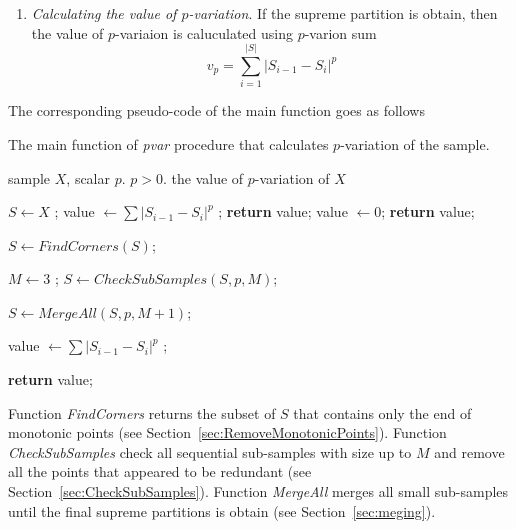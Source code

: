 \documentclass[12pt, a4paper]{article}
\numberwithin{equation}{section}
\begin{document}
\begin{enumerate}
  \item \emph{Calculating the value of $p$-variation}.  
  If the supreme partition is obtain, then
  the value of $p$-variaion is caluculated using 
  $p$-varion sum
  $$
  v_p = \sum_{i=1}^{|S|} |S_{i-1}-S_i |^p
  $$
  
  
\end{enumerate}



The corresponding pseudo-code of the main function goes as follows

\begin{algorithm}[H]
\caption{The main function of \emph{pvar} procedure that calculates $p$-variation of the sample.}\label{alg:pvarmain}
\begin{algorithmic}[1]
\Input sample $X$, scalar $p$.
\Require $p>0$.
\Output the value of $p$-variation of $X$
\item[] 
\State $S \leftarrow X$ ; 
  \State value $\leftarrow \sum |S_{i-1}-S_i |^p $ ; 
  \State \textbf{return} value; 
\EndIf
{}
  \State value $\leftarrow 0$;
  \State \textbf{return} value;
\EndIf

\item[] 
\State $S \leftarrow FindCorners(S)$;

\item[] 
\State $M \leftarrow 3$ ;
\State $S \leftarrow CheckSubSamples (S, p, M)$;

\item[] 
\State $S \leftarrow MergeAll (S,  p, M+1)$;

\item[]
\State value $\leftarrow \sum |S_{i-1}-S_i |^p $ ; 

\State \textbf{return} value;
\EndFunction
\end{algorithmic}
\end{algorithm}


Function \emph{FindCorners} returns the
subset of $S$ that contains only the end of monotonic points (see Section~\ref{sec:RemoveMonotonicPoints}). 
Function \emph{CheckSubSamples} check all
sequential sub-samples with size up to $M$ and remove
all the points that appeared to be redundant (see Section~\ref{sec:CheckSubSamples}).
Function \emph{MergeAll} merges all small
sub-samples until the final supreme partitions is obtain (see Section~\ref{sec:meging}).
\end{document}
